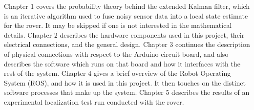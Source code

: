 Chapter 1 covers the probability theory behind the extended Kalman filter, which is an iterative algorithm used to fuse noisy sensor data into a local state estimate for the rover. It may be skipped if one is not interested in the mathematical details. Chapter 2 describes the hardware components used in this project, their electrical connections, and the general design. Chapter 3 continues the description of physical connections with respect to the Arduino circuit board, and also describes the software which runs on that board and how it interfaces with the rest of the system. Chapter 4 gives a brief overview of the Robot Operating System (ROS), and how it is used in this project. It then touches on the distinct software processes that make up the system. Chapter 5 describes the results of an experimental localization test run conducted with the rover.

